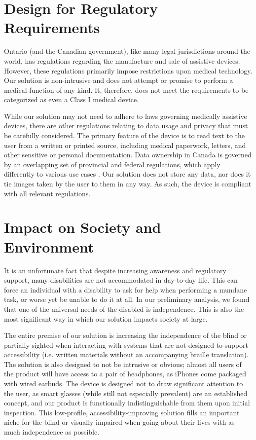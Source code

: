 \documentclass[a4paper,11pt]{article}
\begin{document}
\newpage
\section{Design for Regulatory Requirements}
Ontario (and the Canadian government), like many legal jurisdictions around the world, has regulations regarding the manufacture and sale of assistive devices. However, these regulations primarily impose restrictions upon medical technology. Our solution is non-intrusive and does not attempt or promise to perform a medical function of any kind. It, therefore, does not meet the requirements to be categorized as even a Class I medical device.

While our solution may not need to adhere to laws governing medically assistive devices, there are other regulations relating to data usage and privacy that must be carefully considered. The primary feature of the device is to read text to the user from a written or printed source, including medical paperwork, letters, and other sensitive or personal documentation. Data ownership in Canada is governed by an overlapping set of provincial and federal regulations, which apply differently to various use cases \cite{pipeda}. Our solution does not store any data, nor does it tie images taken by the user to them in any way. As such, the device is compliant with all relevant regulations.

\section{Impact on Society and Environment}
It is an unfortunate fact that despite increasing awareness and regulatory support, many disabilities are not accommodated in day-to-day life. This can force an individual with a disability to ask for help when performing a mundane task, or worse yet be unable to do it at all. In our preliminary analysis, we found that one of the universal needs of the disabled is independence. This is also the most significant way in which our solution impacts society at large.

The entire premise of our solution is increasing the independence of the blind or partially sighted when interacting with systems that are not designed to support accessibility (i.e. written materials without an accompanying braille translation). The solution is also designed to not be intrusive or obvious; almost all users of the product will have access to a pair of headphones, as iPhones come packaged with wired earbuds. The device is designed not to draw significant attention to the user, as smart glasses (while still not especially prevalent) are an established concept, and our product is functionally indistinguishable from them upon initial inspection. This low-profile, accessibility-improving solution fills an important niche for the blind or visually impaired when going about their lives with as much independence as possible.
\end{document}
